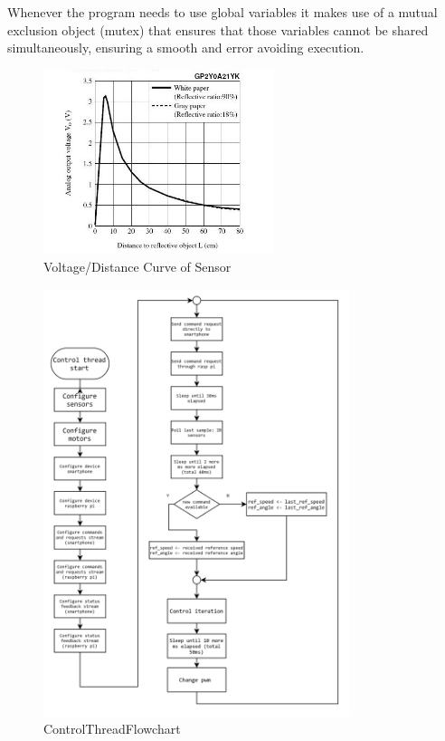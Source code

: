 Whenever the program needs to use global variables it makes use of a mutual exclusion object (mutex) that ensures that those variables cannot be shared simultaneously, ensuring a smooth and error avoiding execution.
\begin{figure}[!htbp]
\centering
       \includegraphics[page=1,width=0.6\textwidth]{img/sensorCurve.jpg} 
\caption{Voltage/Distance Curve of Sensor}%
\label{fig:sensorCurvel}
\end{figure}
\begin{figure}[!htbp]
\centering
       \includegraphics[page=1,width=0.8\textwidth]{img/controlThreadFlowchart.png} 
\caption{ControlThreadFlowchart}%
\label{fig:controlFlowChart}
\end{figure}